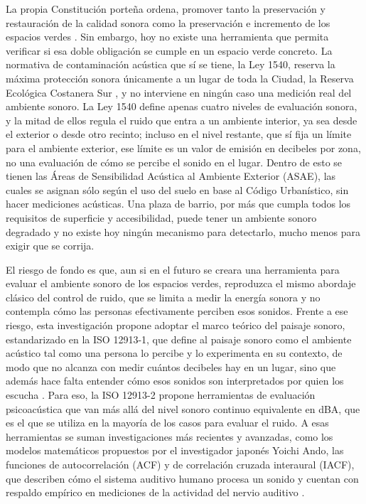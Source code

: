 \documentclass[11pt]{article}
\begin{document}
La propia Constitución porteña ordena, promover tanto la preservación y restauración de la calidad sonora como la preservación e incremento de los espacios verdes \parencite[art.~27]{constitucioncaba}. Sin embargo, hoy no existe una herramienta que permita verificar si esa doble obligación se cumple en un espacio verde concreto. La normativa de contaminación acústica que sí se tiene, la Ley 1540,  reserva la máxima protección sonora únicamente a un lugar de toda la Ciudad, la Reserva Ecológica Costanera Sur \parencite{ley1540,decreto740}, y no interviene en ningún caso una medición real del ambiente sonoro. La Ley 1540 define apenas cuatro niveles de evaluación sonora, y la mitad de ellos regula el ruido que entra a un ambiente interior, ya sea desde el exterior o desde otro recinto; incluso en el nivel restante, que sí fija un límite para el ambiente exterior, ese límite es un valor de emisión en decibeles por zona, no una evaluación de cómo se percibe el sonido en el lugar. Dentro de esto se tienen las Áreas de Sensibilidad Acústica al Ambiente Exterior (ASAE), las cuales se asignan sólo según el uso del suelo en base al Código Urbanístico, sin hacer mediciones acústicas. Una plaza de barrio, por más que cumpla todos los requisitos de superficie y accesibilidad, puede tener un ambiente sonoro degradado y no existe hoy ningún mecanismo para detectarlo, mucho menos para exigir que se corrija.

El riesgo de fondo es que, aun si en el futuro se creara una herramienta para evaluar el ambiente sonoro de los espacios verdes, reproduzca el mismo abordaje clásico del control de ruido, que se limita a medir la energía sonora y no contempla cómo las personas efectivamente perciben esos sonidos. Frente a ese riesgo, esta investigación propone adoptar el marco teórico del paisaje sonoro, estandarizado en la ISO 12913-1, que define al paisaje sonoro como el ambiente acústico tal como una persona lo percibe y lo experimenta en su contexto, de modo que no alcanza con medir cuántos decibeles hay en un lugar, sino que además hace falta entender cómo esos sonidos son interpretados por quien los escucha \parencite{iso129131}. Para eso, la ISO 12913-2 propone herramientas de evaluación psicoacústica que van más allá del nivel sonoro continuo equivalente en dBA, que es el que se utiliza en la mayoría de los casos para evaluar el ruido. A esas herramientas se suman investigaciones más recientes y avanzadas, como los modelos matemáticos propuestos por el investigador japonés Yoichi Ando, las funciones de autocorrelación (ACF) y de correlación cruzada interaural (IACF), que describen cómo el sistema auditivo humano procesa un sonido y cuentan con respaldo empírico en mediciones de la actividad del nervio auditivo \parencite{ando2001,soeta2015}.
\end{document}
